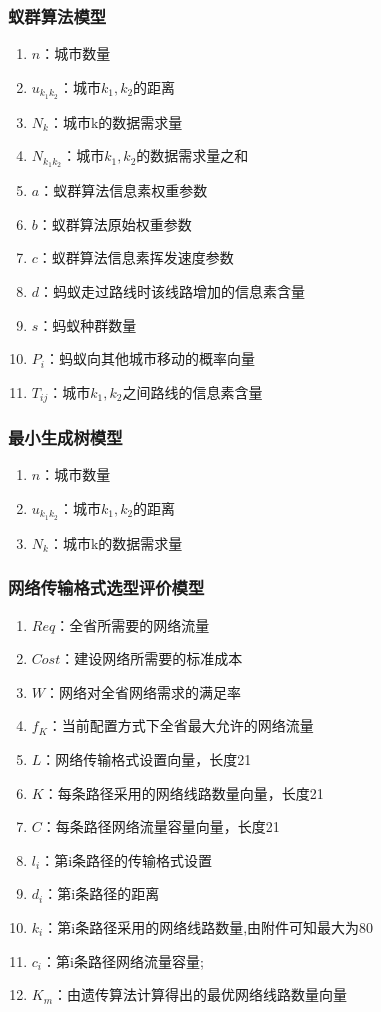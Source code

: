\documentclass[UTF8,12pt]{ctexart}
\begin{document}
      \subsubsection{蚁群算法模型}
        \begin{enumerate}
            \item $n$：城市数量
            \item $u_{k_1k_2}$：城市$k_1,k_2$的距离
            \item $N_k$：城市k的数据需求量
            \item $N_{k_1k_2}$：城市$k_1,k_2$的数据需求量之和
            \item $a$：蚁群算法信息素权重参数
            \item $b$：蚁群算法原始权重参数
            \item $c$：蚁群算法信息素挥发速度参数
            \item $d$：蚂蚁走过路线时该线路增加的信息素含量
            \item $s$：蚂蚁种群数量
            \item $P_i$：蚂蚁向其他城市移动的概率向量
            \item $T_{ij}$：城市$k_1,k_2$之间路线的信息素含量
        \end{enumerate}
      \subsubsection{最小生成树模型}
        \begin{enumerate}
            \item $n$：城市数量
            \item $u_{k_1k_2}$：城市$k_1,k_2$的距离
            \item $N_k$：城市k的数据需求量
        \end{enumerate}
      \subsubsection{网络传输格式选型评价模型}
        \begin{enumerate}
            \item $Req$：全省所需要的网络流量
            \item $Cost$：建设网络所需要的标准成本
            \item $W$：网络对全省网络需求的满足率
            \item $f_K$：当前配置方式下全省最大允许的网络流量
            \item $L$：网络传输格式设置向量，长度21
            \item $K$：每条路径采用的网络线路数量向量，长度21
            \item $C$：每条路径网络流量容量向量，长度21
            \item $l_i$：第i条路径的传输格式设置
            \item $d_i$：第i条路径的距离
            \item $k_i$：第i条路径采用的网络线路数量,由附件可知最大为80
            \item $c_i$：第i条路径网络流量容量;
            \item $K_m$：由遗传算法计算得出的最优网络线路数量向量
        \end{enumerate}
\end{document}
